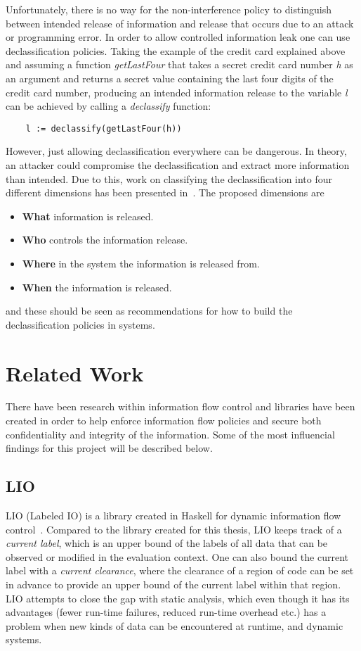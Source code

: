 Unfortunately, there is no way for the non-interference policy to distinguish between intended release of information and release that occurs due to an attack or programming error. In order to allow controlled information leak one can use declassification policies.
Taking the example of the credit card explained above and assuming a function \emph{getLastFour} that takes a secret credit card number \emph{h} as an argument and returns a secret value containing the last four digits of the credit card number, producing an intended information release to the variable \emph{l} can be achieved by calling a \emph{declassify} function:
\begin{verbatim}
    l := declassify(getLastFour(h))
\end{verbatim}
However, just allowing declassification everywhere can be dangerous. In theory, an attacker could compromise the declassification and extract more information than intended. Due to this, work on classifying the declassification into four different dimensions has been presented in~\cite{declassification-dimensions}. The proposed dimensions are
\begin{itemize}
  \item \textbf{What} information is released.
  \item \textbf{Who} controls the information release.
  \item \textbf{Where} in the system the information is released from.
  \item \textbf{When} the information is released.
\end{itemize}
and these should be seen as recommendations for how to build the declassification policies in systems.
\section{Related Work}
\label{chapter:related}
There have been research within information flow control and libraries have been created in order to help enforce information flow policies and secure both confidentiality and integrity of the information. Some of the most influencial findings for this project will be described below.
\subsection{LIO}
LIO (Labeled IO) is a library created in Haskell for dynamic information flow control~\cite{lio-2011}. Compared to the library created for this thesis, LIO keeps track of a \emph{current label}, which is an upper bound of the labels of all data that can be observed or modified in the evaluation context. One can also bound the current label with a \emph{current clearance}, where the clearance of a region of code can be set in advance to provide an upper bound of the current label within that region. LIO attempts to close the gap with static analysis, which even though it has its advantages (fewer run-time failures, reduced run-time overhead etc.) has a problem when new kinds of data can be encountered at runtime, and dynamic systems.
